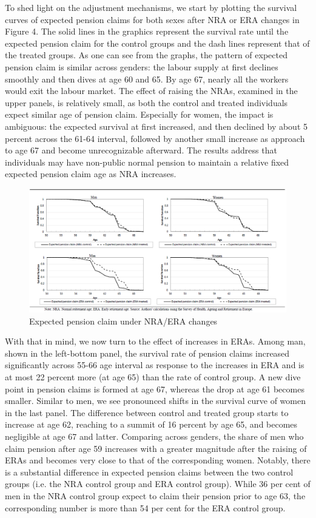 \documentclass[a4paper]{article}
\begin{document}
To shed light on the adjustment mechanisms, we start by plotting the survival curves of expected pension claims for both sexes after NRA or ERA changes in Figure 4. The solid lines in the graphics represent the survival rate until the expected pension claim for the control groups and the dash lines represent that of the treated groups. As one can see from the graphs, the pattern of expected pension claim is similar across genders: the labour supply at first declines smoothly and then dives at age 60 and 65. By age 67, nearly all the workers would exit the labour market. The effect of raising the NRAs, examined in the upper panels, is relatively small, as both the control and treated individuals expect similar age of pension claim. Especially for women, the impact is ambiguous: the expected survival at first increased, and then declined by about 5 percent across the 61-64 interval, followed by another small increase as approach to age 67 and become unrecognizable afterward. The results address that individuals may have non-public normal pension to maintain a relative fixed expected pension claim age as NRA increases.   

\begin{figure}[h] 
    \centering
    \includegraphics[width=1\linewidth]{figure4.png}
    \caption{Expected pension claim under NRA/ERA changes}
    \label{4}
\end{figure}

With that in mind, we now turn to the effect of increases in ERAs. Among man, shown in the left-bottom panel, the survival rate of pension claims increased significantly across 55-66 age interval as response to the increases in ERA and is at most 22 percent more (at age 65) than the rate of control group. A new dive point in pension claims is formed at age 67, whereas the drop at age 61 becomes smaller. Similar to men, we see pronounced shifts in the survival curve of women in the last panel. The difference between control and treated group starts to increase at age 62, reaching to a summit of 16 percent by age 65, and becomes negligible at age 67 and latter. Comparing across genders, the share of men who claim pension after age 59 increases with a greater magnitude after the raising of ERAs and becomes very close to that of the corresponding women. Notably, there is a substantial difference in expected pension claims between the two control groups (i.e. the NRA control group and ERA control group). While 36 per cent of men in the NRA control group expect to claim their pension prior to age 63, the corresponding number is more than 54 per cent for the ERA control group. 
\end{document}
